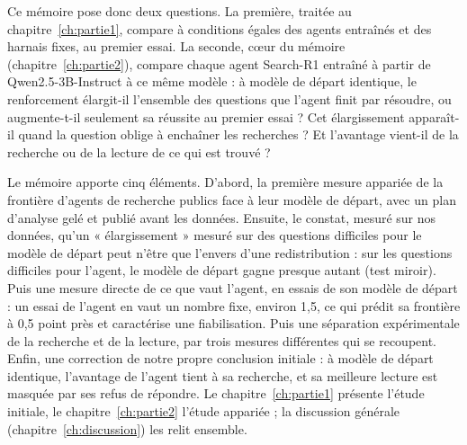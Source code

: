 Ce mémoire pose donc deux questions. La première, traitée au chapitre~\ref{ch:partie1}, compare à conditions égales des agents entraînés et des harnais fixes, au premier essai. La seconde, cœur du mémoire (chapitre~\ref{ch:partie2}), compare chaque agent Search-R1 entraîné à partir de Qwen2.5-3B-Instruct à ce même modèle : à modèle de départ identique, le renforcement élargit-il l'ensemble des questions que l'agent finit par résoudre, ou augmente-t-il seulement sa réussite au premier essai ? Cet élargissement apparaît-il quand la question oblige à enchaîner les recherches ? Et l'avantage vient-il de la recherche ou de la lecture de ce qui est trouvé ?

Le mémoire apporte cinq éléments. D'abord, la première mesure appariée de la frontière d'agents de recherche publics face à leur modèle de départ, avec un plan d'analyse gelé et publié avant les données. Ensuite, le constat, mesuré sur nos données, qu'un « élargissement » mesuré sur des questions difficiles pour le modèle de départ peut n'être que l'envers d'une redistribution : sur les questions difficiles pour l'agent, le modèle de départ gagne presque autant (test miroir). Puis une mesure directe de ce que vaut l'agent, en essais de son modèle de départ : un essai de l'agent en vaut un nombre fixe, environ 1,5, ce qui prédit sa frontière à 0,5 point près et caractérise une fiabilisation. Puis une séparation expérimentale de la recherche et de la lecture, par trois mesures différentes qui se recoupent. Enfin, une correction de notre propre conclusion initiale : à modèle de départ identique, l'avantage de l'agent tient à sa recherche, et sa meilleure lecture est masquée par ses refus de répondre. Le chapitre~\ref{ch:partie1} présente l'étude initiale, le chapitre~\ref{ch:partie2} l'étude appariée ; la discussion générale (chapitre~\ref{ch:discussion}) les relit ensemble.

